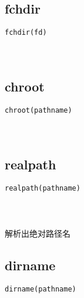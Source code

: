 \documentclass[10pt,a4paper]{article}
\begin{document}
\subsection{fchdir}
\begin{spacing}{2.0}
\lstset{language=C,numbers=none}
\begin{lstlisting}
fchdir(fd)
\end{lstlisting}
{\large\color[rgb]{0.2,0.4,0.6}{fd:}}
\paragraph{ \ \ }
\end{spacing}

\subsection{chroot}
\begin{spacing}{2.0}
\lstset{language=C,numbers=none}
\begin{lstlisting}
chroot(pathname)
\end{lstlisting}
{\large\color[rgb]{0.2,0.4,0.6}{pathname:}}
\paragraph{ \ \ }
\end{spacing}

\subsection{realpath}
\begin{spacing}{2.0}
\lstset{language=C,numbers=none}
\begin{lstlisting}
realpath(pathname)
\end{lstlisting}
{\large\color[rgb]{0.2,0.4,0.6}{pathname:}}
\paragraph{ \ \ }解析出绝对路径名
\end{spacing}

\subsection{dirname}
\begin{spacing}{2.0}
\lstset{language=C,numbers=none}
\begin{lstlisting}
dirname(pathname)
\end{lstlisting}
{\large\color[rgb]{0.2,0.4,0.6}{pathname:}}
\paragraph{ \ \ }
\end{spacing}
\end{document}
